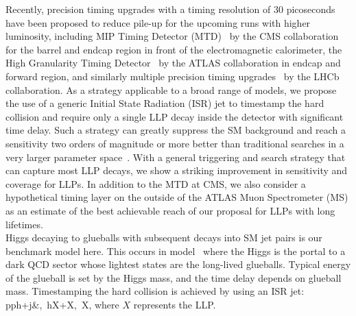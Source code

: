 Recently, precision timing upgrades with a timing resolution of 30 picoseconds have been proposed to reduce pile-up for the upcoming 
runs with higher luminosity, including MIP Timing Detector (MTD)~\cite{Collaboration:2296612}  by the CMS collaboration for 
the barrel and endcap region in front of the electromagnetic calorimeter, the High Granularity Timing Detector~\cite{Allaire:2018bof} 
by the ATLAS collaboration in endcap and forward region,  and similarly multiple precision timing upgrades~\cite{Aaij:2244311} by the 
LHCb collaboration.
As a strategy applicable to a broad range of models, we propose the use of a generic Initial State Radiation (ISR) jet to timestamp the hard collision and require only a single LLP decay inside the detector with significant time delay. Such a strategy can greatly suppress the SM background and 
reach a sensitivity two orders of magnitude or more better than traditional searches in a very larger parameter space~\cite{Aad:2015uaa, CMS:2014wda,Coccaro:2016lnz, Liu:2015bma}. 
With a general triggering and search strategy that can capture most LLP decays, 
we show a striking improvement in sensitivity and coverage for LLPs. In addition to the MTD at CMS, we also consider a hypothetical timing layer on the outside of the ATLAS Muon Spectrometer (MS) as an estimate of the best achievable reach of our proposal for LLPs with long lifetimes.  \\

Higgs decaying to glueballs with subsequent decays into SM jet pairs is our benchmark model here. This occurs in model~\cite{Craig:2015pha} where the Higgs is the portal to a dark QCD sector whose lightest states are the long-lived glueballs. 
Typical energy of the glueball is set by the Higgs mass, and the time delay depends on glueball mass. 
Timestamping the hard collision is achieved by using an ISR jet: 
\bea
pp\rightarrow h+j&,\ h\rightarrow X+X,\ X,   %
\eea
where $X$ represents the LLP.

